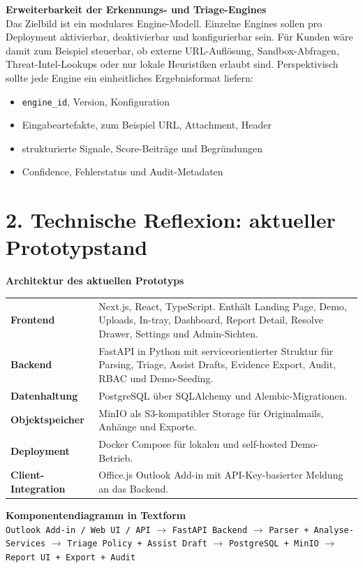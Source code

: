 \documentclass[10pt,a4paper]{article}
\begin{document}
\noindent\textbf{Erweiterbarkeit der Erkennungs- und Triage-Engines}\\
Das Zielbild ist ein modulares Engine-Modell. Einzelne Engines sollen pro Deployment aktivierbar, deaktivierbar und konfigurierbar sein. Für Kunden wäre damit zum Beispiel steuerbar, ob externe URL-Auflösung, Sandbox-Abfragen, Threat-Intel-Lookups oder nur lokale Heuristiken erlaubt sind. Perspektivisch sollte jede Engine ein einheitliches Ergebnisformat liefern:
\begin{itemize}
  \item \texttt{engine\_id}, Version, Konfiguration
  \item Eingabeartefakte, zum Beispiel URL, Attachment, Header
  \item strukturierte Signale, Score-Beiträge und Begründungen
  \item Confidence, Fehlerstatus und Audit-Metadaten
\end{itemize}

\newpage

\section*{2. Technische Reflexion: aktueller Prototypstand}

\noindent\textbf{Architektur des aktuellen Prototyps}\\
\noindent\begin{tabularx}{\textwidth}{@{}>{\bfseries}p{3.4cm}X@{}}
Frontend & Next.js, React, TypeScript. Enthält Landing Page, Demo, Uploads, In-tray, Dashboard, Report Detail, Resolve Drawer, Settings und Admin-Sichten.\\
Backend & FastAPI in Python mit serviceorientierter Struktur für Parsing, Triage, Assist Drafts, Evidence Export, Audit, RBAC und Demo-Seeding.\\
Datenhaltung & PostgreSQL über SQLAlchemy und Alembic-Migrationen.\\
Objektspeicher & MinIO als S3-kompatibler Storage für Originalmails, Anhänge und Exporte.\\
Deployment & Docker Compose für lokalen und self-hosted Demo-Betrieb.\\
Client-Integration & Office.js Outlook Add-in mit API-Key-basierter Meldung an das Backend.\\
\end{tabularx}

\vspace{0.35em}
\noindent\textbf{Komponentendiagramm in Textform}\\
\texttt{Outlook Add-in / Web UI / API} \(\rightarrow\) \texttt{FastAPI Backend} \(\rightarrow\) \texttt{Parser + Analyse-Services} \(\rightarrow\) \texttt{Triage Policy + Assist Draft} \(\rightarrow\) \texttt{PostgreSQL + MinIO} \(\rightarrow\) \texttt{Report UI + Export + Audit}
\end{document}
